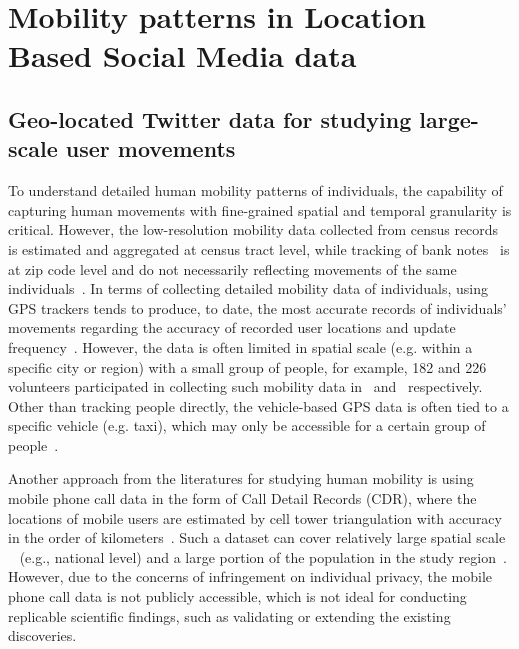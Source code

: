 \documentclass[ijgi,article,submit,moreauthors,pdftex,10pt,a4paper]{mdpi}
\theoremstyle{mdpi}
\newcounter{ex}
\newcounter{re}
\theoremstyle{mdpidefinition}
\begin{document}
\section{Mobility patterns in Location Based Social Media data}
\subsection{Geo-located Twitter data for studying large-scale user movements}
To understand detailed human mobility patterns of individuals, the capability of capturing human movements with fine-grained spatial and temporal granularity is critical.
However, the low-resolution mobility data collected from census records~\cite{greenwood1985human} is estimated and aggregated at census tract level, while tracking of bank notes~\cite{brockmann2006scaling} is at zip code level and do not necessarily reflecting movements of the same individuals~\cite{gonzalez2008understanding}.
In terms of collecting detailed mobility data of individuals, using GPS trackers tends to produce, to date, the most accurate records of individuals' movements regarding the accuracy of recorded user locations and update frequency~\cite{zheng2008understanding}. However, the data is often limited in spatial scale (e.g. within a specific city or region) with a small group of people, for example, 182 and 226 volunteers participated in collecting such mobility data in~\cite{zheng2010geolife} and~\cite{rhee2011levy} respectively. Other than tracking people directly, the vehicle-based GPS data is often tied to a specific vehicle (e.g. taxi), which may only be accessible for a certain group of people~\cite{kung2014exploring}. 

Another approach from the literatures for studying human mobility is using mobile phone call data in the form of Call Detail Records (CDR), where the locations of mobile users are estimated by cell tower triangulation with accuracy in the order of kilometers~\cite{gonzalez2008understanding,sevtsuk2010does,kung2014exploring}. 
Such a dataset can cover relatively large spatial scale ~\cite{becker2013human,sobolevsky2013delineating} (e.g., national level) and a large portion of the population in the study region~\cite{kung2014exploring}. However, due to the concerns of infringement on individual privacy, the mobile phone call data is not publicly accessible, which is not ideal  for conducting replicable scientific findings, such as validating or extending the existing discoveries.
\end{document}
